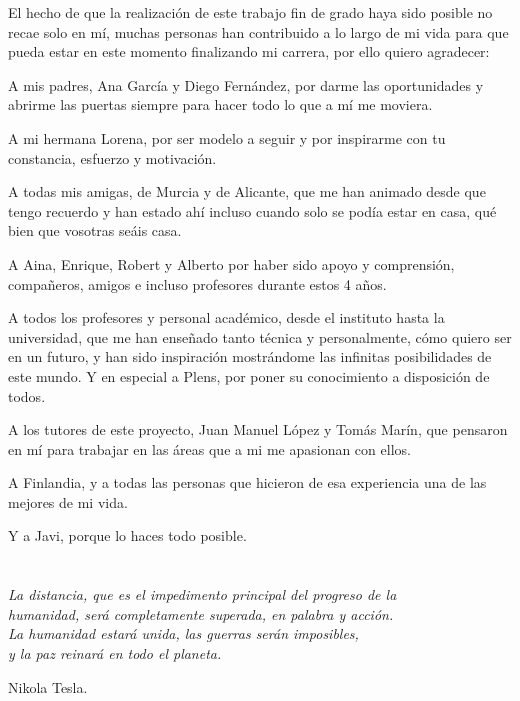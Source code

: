 \par El hecho de que la realización de este trabajo fin de grado haya sido posible no recae solo en mí, muchas personas han contribuido a lo largo de mi vida para que pueda estar en este momento finalizando mi carrera, por ello quiero agradecer:
\par A mis padres, Ana García y Diego Fernández, por darme las oportunidades y abrirme las puertas siempre para hacer todo lo que a mí me moviera.
\par A mi hermana Lorena, por ser modelo a seguir y por inspirarme con tu constancia, esfuerzo y motivación. 
\par A todas mis amigas, de Murcia y de Alicante, que me han animado desde que tengo recuerdo y han estado ahí incluso cuando solo se podía estar en casa, qué bien que vosotras seáis casa. 
\par A Aina, Enrique, Robert y Alberto por haber sido apoyo y comprensión, compañeros, amigos e incluso profesores durante estos 4 años.
\par A todos los profesores y personal académico, desde el instituto hasta la universidad, que me han enseñado tanto técnica y personalmente, cómo quiero ser en un futuro, y han sido inspiración mostrándome las infinitas posibilidades de este mundo. Y en especial a Plens, por poner su conocimiento a disposición de todos. 
\par A los tutores de este proyecto, Juan Manuel López y Tomás Marín, que pensaron en mí para trabajar en las áreas que a mi me apasionan con ellos. 
\par A Finlandia, y a todas las personas que hicieron de esa experiencia una de las mejores de mi vida. 
\par Y a Javi, porque lo haces todo posible. 

\cleardoublepage %
\chapter*{}
\setlength{\leftmargin}{0.5\textwidth}
\setlength{\parsep}{0cm}
\addtolength{\topsep}{0.5cm}
\begin{flushright}
\small\em{
La distancia, que es el impedimento principal del progreso de la \\ humanidad, será completamente superada, en palabra y acción.\\
La humanidad estará unida, las guerras serán imposibles, \\
y la paz reinará en todo el planeta.
}
\end{flushright}
\begin{flushright}
\small{
Nikola Tesla.
}
\end{flushright}
\cleardoublepage %
